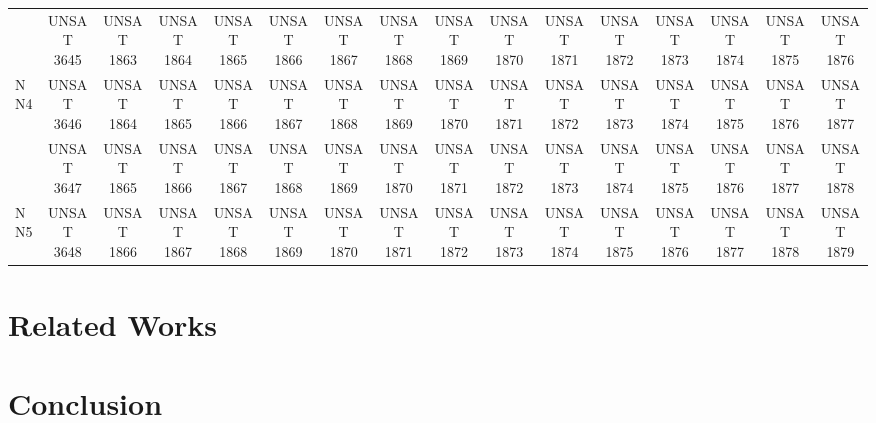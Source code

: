\documentclass[runningheads]{llncs}
\begin{document}
\begin{table}[h]
\begin{tabular}{lccccccccccccccc}
    & 	 UNSAT 3645 	 & 	 UNSAT 1863 	 & 	 UNSAT 1864 	 & 	 UNSAT 1865 	 & 	 UNSAT 1866 	 & 	 UNSAT 1867 	 & 	 UNSAT 1868 	 & 	 UNSAT 1869 	 & 	 UNSAT 1870 	 & 	 UNSAT 1871 	 & 	 UNSAT 1872 	 & 	 UNSAT 1873 	 & 	 UNSAT 1874 	 & 	 UNSAT 1875 	 & 	 UNSAT 1876 \\ 
NN4 	 & 	 UNSAT 3646 	 & 	 UNSAT 1864 	 & 	 UNSAT 1865 	 & 	 UNSAT 1866 	 & 	 UNSAT 1867 	 & 	 UNSAT 1868 	 & 	 UNSAT 1869 	 & 	 UNSAT 1870 	 & 	 UNSAT 1871 	 & 	 UNSAT 1872 	 & 	 UNSAT 1873 	 & 	 UNSAT 1874 	 & 	 UNSAT 1875 	 & 	 UNSAT 1876 	 & 	 UNSAT 1877 \\ 
    & 	 UNSAT 3647 	 & 	 UNSAT 1865 	 & 	 UNSAT 1866 	 & 	 UNSAT 1867 	 & 	 UNSAT 1868 	 & 	 UNSAT 1869 	 & 	 UNSAT 1870 	 & 	 UNSAT 1871 	 & 	 UNSAT 1872 	 & 	 UNSAT 1873 	 & 	 UNSAT 1874 	 & 	 UNSAT 1875 	 & 	 UNSAT 1876 	 & 	 UNSAT 1877 	 & 	 UNSAT 1878 \\ 
NN5 	 & 	 UNSAT 3648 	 & 	 UNSAT 1866 	 & 	 UNSAT 1867 	 & 	 UNSAT 1868 	 & 	 UNSAT 1869 	 & 	 UNSAT 1870 	 & 	 UNSAT 1871 	 & 	 UNSAT 1872 	 & 	 UNSAT 1873 	 & 	 UNSAT 1874 	 & 	 UNSAT 1875 	 & 	 UNSAT 1876 	 & 	 UNSAT 1877 	 & 	 UNSAT 1878 	 & 	 UNSAT 1879 \\ 
\end{tabular}
\end{table}

\section{Related Works}


\section{Conclusion}



%
\end{document}
